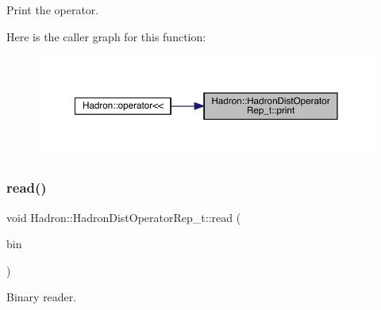 Print the operator. 

Here is the caller graph for this function\+:\nopagebreak
\begin{figure}[H]
\begin{center}
\leavevmode
\includegraphics[width=350pt]{dd/de0/classHadron_1_1HadronDistOperatorRep__t_a800e1844116007d2ca372628f2388ee5_icgraph}
\end{center}
\end{figure}
\mbox{\label{classHadron_1_1HadronDistOperatorRep__t_a17387b2569f243bf0aecc9c6f4160051}} 
\subsubsection{\texorpdfstring{read()}{read()}}
{\footnotesize\ttfamily void Hadron\+::\+Hadron\+Dist\+Operator\+Rep\+\_\+t\+::read (\begin{DoxyParamCaption}\item[{\mbox{\hyperlink{classADATIO_1_1BinaryReader}{A\+D\+A\+T\+I\+O\+::\+Binary\+Reader}} \&}]{bin }\end{DoxyParamCaption})}



Binary reader. 


